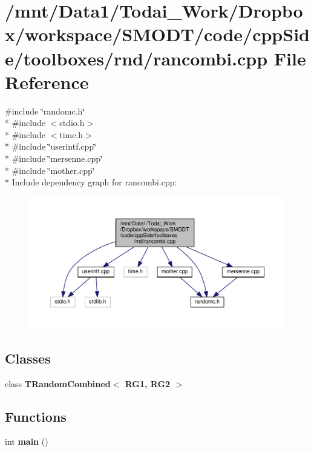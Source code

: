 \section{/mnt/\-Data1/\-Todai\-\_\-\-Work/\-Dropbox/workspace/\-S\-M\-O\-D\-T/code/cpp\-Side/toolboxes/rnd/rancombi.cpp File Reference}
\label{toolboxes_2rnd_2rancombi_8cpp}
{\ttfamily \#include \char`\"{}randomc.\-h\char`\"{}}\\*
{\ttfamily \#include $<$stdio.\-h$>$}\\*
{\ttfamily \#include $<$time.\-h$>$}\\*
{\ttfamily \#include \char`\"{}userintf.\-cpp\char`\"{}}\\*
{\ttfamily \#include \char`\"{}mersenne.\-cpp\char`\"{}}\\*
{\ttfamily \#include \char`\"{}mother.\-cpp\char`\"{}}\\*
Include dependency graph for rancombi.\-cpp\-:\nopagebreak
\begin{figure}[H]
\begin{center}
\leavevmode
\includegraphics[width=350pt]{toolboxes_2rnd_2rancombi_8cpp__incl}
\end{center}
\end{figure}
\subsection*{Classes}
\begin{DoxyCompactItemize}
\item 
class {\bf T\-Random\-Combined$<$ R\-G1, R\-G2 $>$}
\end{DoxyCompactItemize}
\subsection*{Functions}
\begin{DoxyCompactItemize}
\item 
int {\bf main} ()
\end{DoxyCompactItemize}


